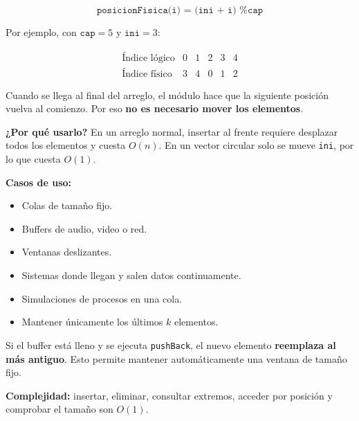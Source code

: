 \documentclass[10pt,a4paper,twocolumn]{article}
\begin{document}
\[
\texttt{posicionFisica(i) = (ini + i) \% cap}
\]

Por ejemplo, con $\texttt{cap}=5$ y $\texttt{ini}=3$:

\[
\begin{array}{c|ccccc}
\text{Índice lógico} & 0 & 1 & 2 & 3 & 4 \\ \hline
\text{Índice físico} & 3 & 4 & 0 & 1 & 2
\end{array}
\]

Cuando se llega al final del arreglo, el módulo hace que la siguiente
posición vuelva al comienzo. Por eso \textbf{no es necesario mover los
elementos}.

\textbf{¿Por qué usarlo?} En un arreglo normal, insertar al frente
requiere desplazar todos los elementos y cuesta $O(n)$. En un vector
circular solo se mueve \texttt{ini}, por lo que cuesta $O(1)$.

\textbf{Casos de uso:}
\begin{itemize}
    \item Colas de tamaño fijo.
    \item Buffers de audio, video o red.
    \item Ventanas deslizantes.
    \item Sistemas donde llegan y salen datos continuamente.
    \item Simulaciones de procesos en una cola.
    \item Mantener únicamente los últimos $k$ elementos.
\end{itemize}

Si el buffer está lleno y se ejecuta \texttt{pushBack}, el nuevo elemento
\textbf{reemplaza al más antiguo}. Esto permite mantener automáticamente
una ventana de tamaño fijo.

\textbf{Complejidad:} insertar, eliminar, consultar extremos, acceder
por posición y comprobar el tamaño son $O(1)$.
\end{document}
